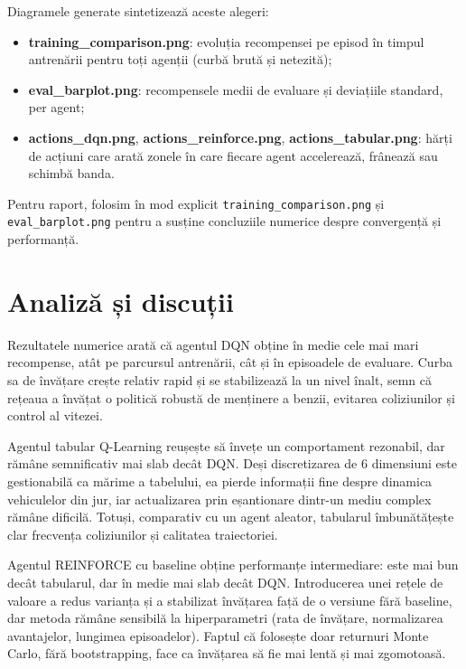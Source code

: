 \documentclass[11pt,a4paper]{article}
\begin{document}
Diagramele generate sintetizează aceste alegeri:
\begin{itemize}
  \item \textbf{training\_comparison.png}: evoluția recompensei pe episod în timpul antrenării pentru
  toți agenții (curbă brută și netezită);
  \item \textbf{eval\_barplot.png}: recompensele medii de evaluare și deviațiile standard, per agent;
  \item \textbf{actions\_dqn.png}, \textbf{actions\_reinforce.png}, \textbf{actions\_tabular.png}: hărți
  de acțiuni care arată zonele în care fiecare agent accelerează, frânează sau schimbă banda.
\end{itemize}

Pentru raport, folosim în mod explicit \texttt{training\_comparison.png} și \texttt{eval\_barplot.png}
pentru a susține concluziile numerice despre convergență și performanță.

\section{Analiză și discuții}

Rezultatele numerice arată că agentul DQN obține în medie cele mai mari
recompense, atât pe parcursul antrenării, cât și în episoadele de evaluare.
Curba sa de învățare crește relativ rapid și se stabilizează la un nivel înalt,
semn că rețeaua a învățat o politică robustă de menținere a benzii, evitarea
coliziunilor și control al vitezei.

Agentul tabular Q-Learning reușește să învețe un comportament rezonabil, dar
rămâne semnificativ mai slab decât DQN. Deși discretizarea de 6 dimensiuni este
gestionabilă ca mărime a tabelului, ea pierde informații fine despre dinamica
vehiculelor din jur, iar actualizarea prin eșantionare dintr-un mediu complex
rămâne dificilă. Totuși, comparativ cu un agent aleator, tabularul îmbunătățește
clar frecvența coliziunilor și calitatea traiectoriei.

Agentul REINFORCE cu baseline obține performanțe intermediare: este mai bun decât
tabularul, dar în medie mai slab decât DQN. Introducerea unei rețele de valoare
a redus varianța și a stabilizat învățarea față de o versiune fără baseline,
dar metoda rămâne sensibilă la hiperparametri (rata de învățare, normalizarea
avantajelor, lungimea episoadelor). Faptul că folosește doar returnuri
Monte Carlo, fără bootstrapping, face ca învățarea să fie mai lentă și mai
zgomotoasă.
\end{document}
